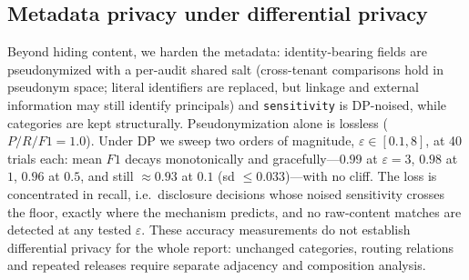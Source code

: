 \subsection{Metadata privacy under differential privacy}
Beyond hiding content, we harden the
metadata: identity-bearing fields are pseudonymized with a per-audit shared salt
(cross-tenant comparisons hold in pseudonym space; literal identifiers are
replaced, but linkage and external information may still identify principals) and \texttt{sensitivity} is DP-noised, while categories are kept
structurally. Pseudonymization alone is lossless ($P/R/F1=1.0$). Under DP we
sweep two orders of magnitude, $\varepsilon\in[0.1,8]$, at 40 trials each: mean
$F1$ decays monotonically and gracefully---$0.99$ at $\varepsilon{=}3$, $0.98$ at
$1$, $0.96$ at $0.5$, and still $\approx0.93$ at $0.1$ (sd $\le0.033$)---with no
cliff. The loss is concentrated in recall, i.e.\ disclosure decisions whose noised
sensitivity crosses the floor, exactly where the mechanism predicts, and no raw-content matches are detected at any tested $\varepsilon$.
These accuracy measurements do not establish differential privacy for the whole
report: unchanged categories, routing relations and repeated releases require
separate adjacency and composition analysis.
